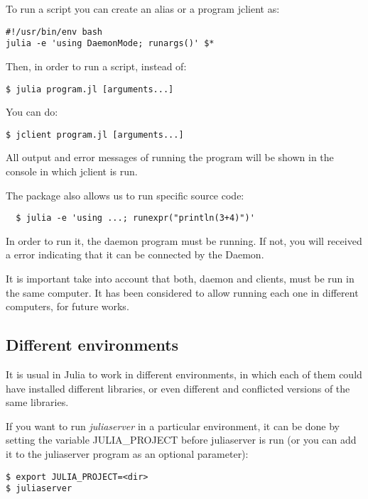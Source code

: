 \documentclass{juliacon}
\begin{document}
To run a script you can create an alias or a program jclient as:

\begin{lstlisting}
#!/usr/bin/env bash
julia -e 'using DaemonMode; runargs()' $*
\end{lstlisting}

Then, in order to run a script, instead of:

\begin{lstlisting}
$ julia program.jl [arguments...]
\end{lstlisting}

You can do:

\begin{lstlisting}
$ jclient program.jl [arguments...]
\end{lstlisting}

All output and error messages of running the program will be shown in the
console in which jclient is run.

The package also allows us to run specific source code:

\begin{lstlisting}
  $ julia -e 'using ...; runexpr("println(3+4)")' 
\end{lstlisting}

In order to run it, the daemon program must be running. If not, you will
received a error indicating that it can be connected by the Daemon.

It is important take into account that both, daemon and clients, must be run in
the same computer. It has been considered to allow running each one in different
computers, for future works.

\subsection{Different environments}
\label{sec:contexts}

It is usual in Julia to work in different environments, in which each of them
could have installed different libraries, or even different and conflicted
versions of the same libraries.

If you want to run \textit{juliaserver} in a particular environment, it can be
done by setting the variable JULIA\_PROJECT before juliaserver is run (or you can
add it to the juliaserver program as an optional parameter):

\begin{lstlisting}
$ export JULIA_PROJECT=<dir>
$ juliaserver  
\end{lstlisting}
\end{document}
